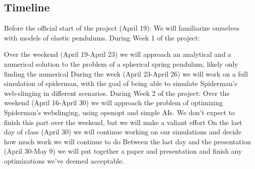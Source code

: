 \subsection{Timeline}
Before the official start of the project (April 19):
       We will familiarize ourselves with models of elastic pendulums.
   During Week 1 of the project:
   
       Over the weekend (April 19-April 23) we will approach an analytical and a numerical solution to the problem of a spherical spring pendulum, likely only finding the numerical
       During the week (April 23-April 26) we will work on a full simulation of spiderman, with the goal of being able to simulate Spiderman's web-slinging in different scenarios.
   During Week 2 of the project:
       Over the weekend (April 16-April 30) we will approach the problem of optimizing
       	  Spiderman's webslinging, using openopt and simple AIs. We don't expect to finish this part over the weekend, but we will make a valiant effort
       On the last day of class (April 30) we will continue working on our simulations and decide how much work we will continue to do
       Between the last day and the presentation (April 30-May 9) we will put together a paper and presentation and finish any optimizations we've deemed acceptable.
